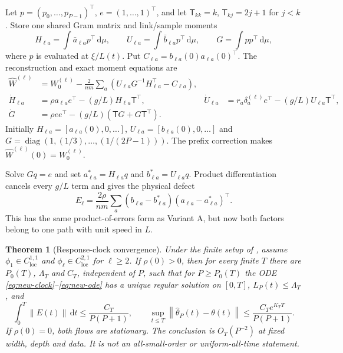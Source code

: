 \documentclass[11pt]{article}
\newtheorem{theorem}{Theorem}[section]
\theoremstyle{definition}
\theoremstyle{remark}
\newcommand{\norm}[1]{\left\lVert #1\right\rVert}
\newcommand{\dd}{\,\mathrm{d}}
\newcommand{\diag}{\operatorname{diag}}
\begin{document}
Let $p=(p_0,\ldots,p_{P-1})^\top$, $e=(1,\ldots,1)^\top$, and let
$\mathsf T_{kk}=k$, $\mathsf T_{kj}=2j+1$ for $j<k$.  Store one shared Gram
matrix and link/sample moments
\[
 H_{\ell a}=\int\bar a_{\ell a}p^\top\dd\mu,\qquad
 U_{\ell a}=\int\bar b_{\ell a}p^\top\dd\mu,\qquad
 G=\int pp^\top\dd\mu,
\]
where $p$ is evaluated at $\xi/L(t)$.  Put
$C_{\ell a}=b_{\ell a}(0)a_{\ell a}(0)^\top$.  The reconstruction and exact
moment equations are
\begin{align}
 \widehat W^{(\ell)}&=W_0^{(\ell)}-\frac{2}{nm}\sum_a
 (U_{\ell a}G^{-1}H_{\ell a}^\top-C_{\ell a}),       \label{eq:new-recon}\\
 \dot H_{\ell a}&=\rho a_{\ell a}e^\top-(g/L)H_{\ell a}\mathsf T^\top,
 &\dot U_{\ell a}&=r_a\delta_a^{(\ell)}e^\top-(g/L)U_{\ell a}\mathsf T^\top,
 \nonumber\\
 \dot G&=\rho ee^\top-(g/L)(\mathsf TG+G\mathsf T^\top). \label{eq:new-ode}
\end{align}
Initially $H_{\ell a}=[a_{\ell a}(0),0,\ldots]$,
$U_{\ell a}=[b_{\ell a}(0),0,\ldots]$ and
$G=\diag(1,(1/3),\ldots,(1/(2P-1)))$.  The prefix correction makes
$\widehat W^{(\ell)}(0)=W_0^{(\ell)}$.

Solve $Gq=e$ and set $a^*_{\ell a}=H_{\ell a}q$ and
$b^*_{\ell a}=U_{\ell a}q$.  Product differentiation cancels every $g/L$
term and gives the physical defect
\begin{equation}
 E_\ell=\frac{2\rho}{nm}\sum_a
 (b_{\ell a}-b^*_{\ell a})(a_{\ell a}-a^*_{\ell a})^\top. \label{eq:new-defect}
\end{equation}
This has the same product-of-errors form as Variant A, but now both factors
belong to one path with unit speed in $L$.

\begin{theorem}[Response-clock convergence]
\label{thm:new}
Under the finite setup of , assume
$\phi_1\in C^{1,1}_{\mathrm{loc}}$ and
$\phi_\ell\in C^{2,1}_{\mathrm{loc}}$ for $\ell\ge2$.  If $\rho(0)>0$, then
for every finite $T$ there are $P_0(T)$, $\Lambda_T$ and $C_T$, independent
of $P$, such that for $P\ge P_0(T)$ the ODE
\eqref{eq:new-clock}--\eqref{eq:new-ode} has a unique regular solution on
$[0,T]$, $L_P(t)\le\Lambda_T$, and
\begin{equation}
 \int_0^T\norm{E(t)}\dd t\le\frac{C_T}{P(P+1)},\qquad
 \sup_{t\le T}\norm{\widehat\theta_P(t)-\theta(t)}
 \le\frac{C_Te^{K_TT}}{P(P+1)}.                      \label{eq:new-rate}
\end{equation}
If $\rho(0)=0$, both flows are stationary.  The conclusion is
$O_T(P^{-2})$ at fixed width, depth and data.  It is not an all-small-order or
uniform-all-time statement.
\end{theorem}
\end{document}

